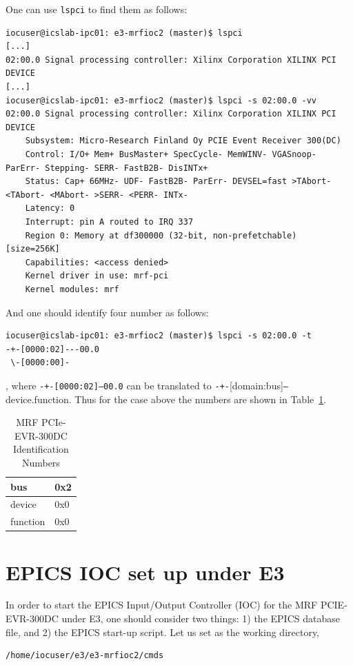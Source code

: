 \documentclass[11pt
  , a4paper
  , article
  , oneside
  , showtrims
]{memoir}
\begin{document}
{One can use \texttt{lspci} to find them as follows:
\begin{lstlisting}[style=termstyle]
iocuser@icslab-ipc01: e3-mrfioc2 (master)$ lspci
[...]
02:00.0 Signal processing controller: Xilinx Corporation XILINX PCI DEVICE
[...]
iocuser@icslab-ipc01: e3-mrfioc2 (master)$ lspci -s 02:00.0 -vv
02:00.0 Signal processing controller: Xilinx Corporation XILINX PCI DEVICE
	Subsystem: Micro-Research Finland Oy PCIE Event Receiver 300(DC)
	Control: I/O+ Mem+ BusMaster+ SpecCycle- MemWINV- VGASnoop- ParErr- Stepping- SERR- FastB2B- DisINTx+
	Status: Cap+ 66MHz- UDF- FastB2B- ParErr- DEVSEL=fast >TAbort- <TAbort- <MAbort- >SERR- <PERR- INTx-
	Latency: 0
	Interrupt: pin A routed to IRQ 337
	Region 0: Memory at df300000 (32-bit, non-prefetchable) [size=256K]
	Capabilities: <access denied>
	Kernel driver in use: mrf-pci
	Kernel modules: mrf

\end{lstlisting}

And one should identify four number as follows:
\begin{lstlisting}[style=termstyle]
iocuser@icslab-ipc01: e3-mrfioc2 (master)$ lspci -s 02:00.0 -t
-+-[0000:02]---00.0
 \-[0000:00]-
\end{lstlisting}
, where \texttt{-+-[0000:02]---00.0} can be translated to \texttt{-+-}[domain:bus]\texttt{---}device.function. Thus for the case above the numbers are shown in Table~\ref{table:pciidnumber}.\begin{table}[!htb]
  \centering
  \begin{tabular}{l|l}
    \toprule
    bus      & 0x2 \\\midrule
    device   & 0x0 \\\midrule
    function & 0x0 \\\bottomrule
  \end{tabular}
  \caption[]{MRF PCIe-EVR-300DC Identification Numbers}
  \label{table:pciidnumber}
\end{table}


\section{EPICS IOC set up under E3}
In order to start the EPICS Input/Output Controller (IOC) for the MRF PCIE-EVR-300DC under E3, one should consider two things: 1) the EPICS database file, and 2) the EPICS start-up script. Let us set as the working directory,
\begin{lstlisting}[style=termstyle, label={list:pwd}, caption={Working directory in the ICS lab.} ]
/home/iocuser/e3/e3-mrfioc2/cmds
\end{lstlisting}

}
\end{document}
